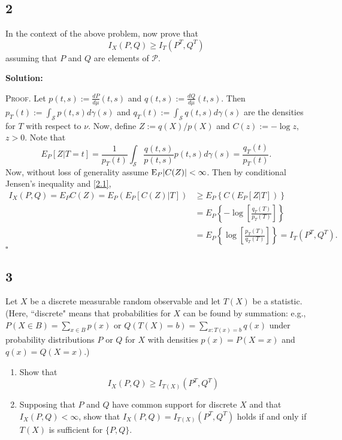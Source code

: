 \documentclass[12pt]{article}
\newcounter{ProofCounter}
\newenvironment{Proof}{\stepcounter{ProofCounter}\textsc{Proof.}}{\hfill$\square$}
\begin{document}
\newpage
\subsection*{2}
\begin{tcolorbox}
  In the context of the above problem, now prove that
  \[
    I_X(P,Q) \geq I_{T}(P^T,Q^T)
  \]
  assuming that $P$ and $Q$ are elements of $\mathcal{P}$.\\
\end{tcolorbox}
\textbf{Solution:}

\begin{Proof}
  Let $p(t,s):=\frac{d P}{d \mu}(t,s)$ and $q(t,s) := \frac{d Q}{d \mu}(t,s)$. Then
  $p_{T}(t) := \int_{\mathcal{S}}p(t,s)d\gamma(s)$ and $q_{T}(t) := \int_{\mathcal{S}}q(t,s)d\gamma(s)$ are the densities for $T$ with respect to
  $\nu$. Now, define $Z := q(X) / p(X)$ and $C(z) := -\log z$, $z > 0$. Note that 
  \begin{equation}
    E_P[Z|T=t] = \frac{1}{p_{T}(t)}\int_{\mathcal{S}}\frac{q(t,s)}{p(t,s)}p(t,s)d\gamma(s) = \frac{q_T(t)}{p_T(t)}.
      \label{2.1}
  \end{equation}
  Now, without loss of generality assume $\mathrm{E}_{P}|C(Z)| < \infty$.
  Then by conditional Jensen's inequality and \eqref{2.1},
  \begin{align*}
    I_X(P,Q) = E_PC(Z) = E_P\left( E_P[C(Z)|T] \right) & \geq E_P\left\{ C\left( E_P[Z|T] \right) \right\} \\
    & = E_P\left\{ -\log\left[ \frac{q_T(T)}{p_T(T)} \right] \right\} \\
    & = E_P\left\{ \log\left[\frac{p_T(T)}{q_T(T)}\right] \right\} = I_T(P^{T},Q^{T}).
  \end{align*}
\end{Proof}

 
 
\newpage
\subsection*{3}
\begin{tcolorbox}
  Let $X$ be a discrete measurable random observable and let $T(X)$ be a statistic.  (Here, ``discrete" means that probabilities for $X$ can be found by summation:  e.g., $P(X \in B) = \sum_{x \in B} p(x)  $ or $Q(T(X)=b) = \sum_{x: T(x)=b} q(x)$ under probability distributions $P$ or $Q$ for $X$ with densities $p(x)=P(X=x)$ and $q(x)=Q(X=x)$.)
  \begin{enumerate}
    \item Show that \[
        I_X(P,Q) \geq I_{T(X)}(P^T,Q^T)
      \]

    \item Supposing that $P$ and $Q$ have common support for discrete $X$ and that $I_X(P,Q)<\infty$,  show that  $I_X(P,Q) = I_{T(X)}(P^T,Q^T)$ holds if and only if $T(X)$ is sufficient for $\{P,Q\}$.
  \end{enumerate}
\end{tcolorbox}
\end{document}
